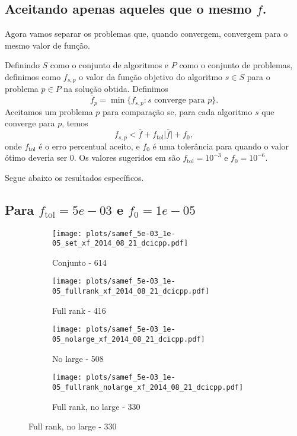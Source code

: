 \documentclass{article}
\newcommand{\ftol}{f_{\mbox{tol}}}
\begin{document}
\subsection{Aceitando apenas aqueles que o mesmo $f$. }

Agora vamos separar os problemas que, quando convergem, convergem para o mesmo
valor de função.

Definindo $S$ como o conjunto de algoritmos e $P$ como o conjunto de problemas,
definimos como $f_{s,p}$ o valor da função objetivo do algoritmo $s \in S$ para
o problema $p \in P$ na solução obtida.
Definimos
$$ \overline{f}_{p} = \min\{f_{s,p} : s \mbox{ converge para } p\}. $$
Aceitamos um problema $p$ para comparação se, para cada algoritmo $s$ que
converge para $p$, temos
$$ f_{s,p} < \overline{f} + \ftol\vert\overline{f}\vert + f_0, $$
onde $\ftol$ é o erro percentual aceito, e $f_0$ é uma tolerância para quando o
valor ótimo deveria ser $0$.
Os valores sugeridos em \cite{bib:compare-optimal-values} são $\ftol=10^{-3}$ e
$f_0 = 10^{-6}$.

Segue abaixo os resultados específicos.

\subsection{Para $\ftol = 5e-03$ e $f_0 = 1e-05$}

\begin{figure}[H]
  \centering
  \begin{subfigure}{0.48\textwidth}
    \texttt{[image: plots/samef\_5e-03\_1e-05\_set\_xf\_2014\_08\_21\_dcicpp.pdf]}
    \caption{Conjunto - 614}
  \end{subfigure}
  \begin{subfigure}{0.48\textwidth}
    \texttt{[image: plots/samef\_5e-03\_1e-05\_fullrank\_xf\_2014\_08\_21\_dcicpp.pdf]}
    \caption{Full rank - 416}
  \end{subfigure}
  \begin{subfigure}{0.48\textwidth}
    \texttt{[image: plots/samef\_5e-03\_1e-05\_nolarge\_xf\_2014\_08\_21\_dcicpp.pdf]}
    \caption{No large - 508}
  \end{subfigure}
  \begin{subfigure}{0.48\textwidth}
    \texttt{[image: plots/samef\_5e-03\_1e-05\_fullrank\_nolarge\_xf\_2014\_08\_21\_dcicpp.pdf]}
    \caption{Full rank, no large - 330}
  \end{subfigure}
\end{figure}
\end{document}
